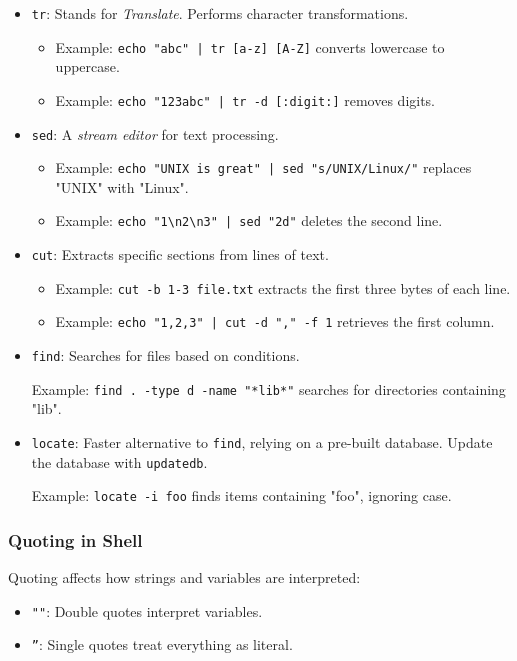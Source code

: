 \begin{itemize}
    \item \texttt{tr}: Stands for \textit{Translate}. Performs character transformations.
    \begin{itemize}
        \item Example: \texttt{echo "abc" | tr [a-z] [A-Z]} converts lowercase to uppercase.
        \item Example: \texttt{echo "123abc" | tr -d [:digit:]} removes digits.
    \end{itemize}
    \item \texttt{sed}: A \textit{stream editor} for text processing.
    \begin{itemize}
        \item Example: \texttt{echo "UNIX is great" | sed "s/UNIX/Linux/"} replaces "UNIX" with "Linux".
        \item Example: \texttt{echo "1\textbackslash n2\textbackslash n3" | sed "2d"} deletes the second line.
    \end{itemize}
    \item \texttt{cut}: Extracts specific sections from lines of text.
    \begin{itemize}
        \item Example: \texttt{cut -b 1-3 file.txt} extracts the first three bytes of each line.
        \item Example: \texttt{echo "1,2,3" | cut -d "," -f 1} retrieves the first column.
    \end{itemize}
    \item \texttt{find}: Searches for files based on conditions.
    
    Example: \texttt{find . -type d -name "*lib*"} searches for directories containing "lib".

    \item \texttt{locate}: Faster alternative to \texttt{find}, relying on a pre-built database. Update the database with \texttt{updatedb}.
    
    Example: \texttt{locate -i foo} finds items containing "foo", ignoring case.
\end{itemize}

\subsubsection{Quoting in Shell}

Quoting affects how strings and variables are interpreted:
\begin{itemize}
    \item \texttt{""}: Double quotes interpret variables.
    \item \texttt{''}: Single quotes treat everything as literal.
\end{itemize}

